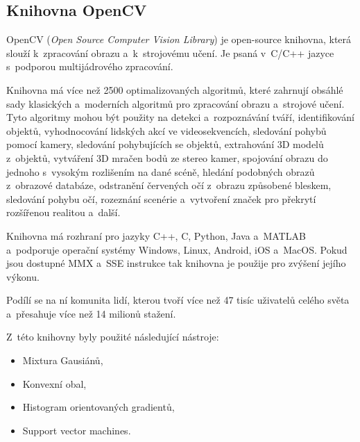 \subsection{Knihovna OpenCV}
OpenCV (\textit{Open Source Computer Vision Library}) je open-source knihovna, která slouží k~zpracování obrazu a~k~strojovému učení. Je psaná v~C/C++ jazyce s~podporou multijádrového zpracování.

Knihovna má více než 2500 optimalizovaných algoritmů, které zahrnují obsáhlé sady klasických a~moderních algoritmů pro zpracování obrazu a~strojové učení. Tyto algoritmy mohou být použity na detekci a~rozpoznávání tváří, identifikování objektů, vyhodnocování lidských akcí ve videosekvencích, sledování pohybů pomocí kamery, sledování pohybujících se objektů, extrahování 3D modelů z~objektů, vytváření 3D mračen bodů ze stereo kamer, spojování obrazu do jednoho s~vysokým rozlišením na dané scéně, hledání podobných obrazů z~obrazové databáze, odstranění červených očí z~obrazu způsobené bleskem, sledování pohybu očí, rozeznání scenérie a~vytvoření značek pro překrytí rozšířenou realitou a~další.

Knihovna má rozhraní pro jazyky C++, C, Python, Java a~MATLAB a~podporuje operační systémy Windows, Linux, Android, iOS a~MacOS. 
Pokud jsou dostupné MMX a~SSE instrukce tak knihovna je použije pro zvýšení jejího výkonu.

Podílí se na ní komunita lidí, kterou tvoří více než 47 tisíc uživatelů celého světa a~přesahuje více než 14 milionů stažení. 



Z~této knihovny byly použité následující nástroje:

\begin{itemize}
  \item{Mixtura Gausiánů,}
  \item{Konvexní obal,}
  \item{Histogram orientovaných gradientů,}
  \item{Support vector machines.}
\end{itemize}